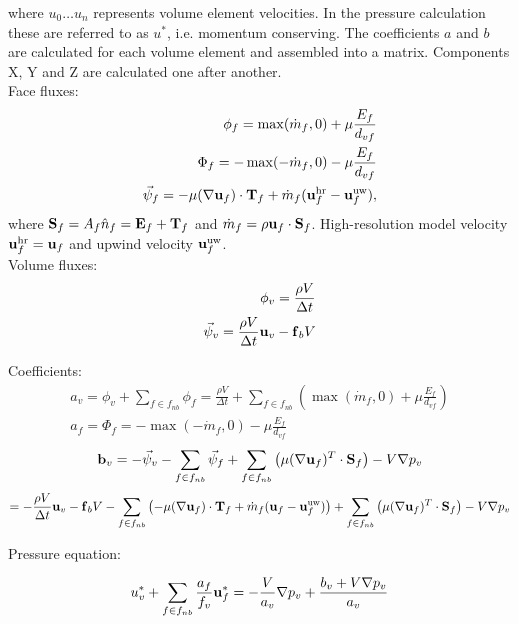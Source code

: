 \documentclass[12pt]{article}
\newcommand{\lb}{\left(}
\newcommand{\rb}{\right)}
\newcommand{\vb}[1]{\text{\textbf{#1}}}
\begin{document}
where $u_0 \dots u_n$ represents volume element velocities. In the pressure calculation these are referred to as $u^*$, i.e. momentum conserving. The coefficients $a$ and $b$ are calculated for each volume element and assembled into a matrix. Components X, Y and Z are calculated one after another.\\

Face fluxes:
\begin{align}
  \phi_f = \max(\dot m_f, 0) + \mu \frac{E_f}{d_{vf}} \\
  \Phi_f = -\max(-\dot m_f, 0) - \mu \frac{E_f}{d_{vf}} \\
  \vec \psi_f = - \mu (\nabla \vb u_f) \cdot \vb T_f + \dot m_f (\vb u_f^{\text{hr}} - \vb u_f^{\text{uw}}),
\end{align}
where $\vb S_f = A_f \hat n_f = \vb E_f + \vb T_f$ and $\dot m_f = \rho \vb u_f \cdot \vb S_f$. High-resolution model velocity $\vb u_f^{\text{hr}} = \vb u_f$ and upwind velocity $\vb u_f^{\text{uw}}$.\\

Volume fluxes:
\begin{align}
  \phi_v = \frac{\rho V}{\Delta t} \\
  \vec \psi_v = \frac{\rho V}{\Delta t} \vb u_v - \vb f_b V
\end{align}

Coefficients:
\begin{align}
  a_v = \phi_v + \sum_{f \in f_{nb}} \phi_f = \frac{\rho V}{\Delta t} + \sum_{f \in f_{nb}} \lb \max(\dot m_f, 0) + \mu \frac{E_f}{d_{vf}} \rb \\
  a_f = \Phi_f = -\max(-\dot m_f, 0) - \mu \frac{E_f}{d_{vf}}
\end{align}
\begin{equation}
  \vb b_v = -\vec \psi_v - \sum_{f \in f_{nb}} \vec \psi_f + \sum_{f \in f_{nb}} \lb \mu (\nabla \vb u_f)^T \cdot \vb S_f \rb - V \nabla p_v
\end{equation}
$$
= - \frac{\rho V}{\Delta t} \vb u_v - \vb f_b V - \sum_{f \in f_{nb}} \lb - \mu (\nabla \vb u_f) \cdot \vb T_f + \dot m_f (\vb u_f - \vb u_f^{\text{uw}}) \rb + \sum_{f \in f_{nb}} \lb \mu (\nabla \vb u_f)^T \cdot \vb S_f \rb - V \nabla p_v
$$

Pressure equation:

\begin{equation}
  u_v^* + \sum_{f \in f_{nb}} \frac{a_f}{f_v} \vb u_f^* = -\frac{V}{a_v} \nabla p_v + \frac{b_v + V \nabla p_v}{a_v}
\end{equation}
\end{document}
